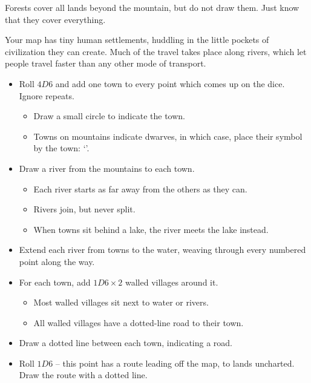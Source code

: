 \begin{multicols}{2}
Forests cover all lands beyond the mountain, but do not draw them. Just
know that they cover everything.


Your map has tiny human settlements, huddling in the little pockets of civilization they can create.
Much of the travel takes place along rivers, which let people travel faster than any other mode of transport.

\begin{itemize}
\item
  Roll $4D6$ and add one town to every point which comes up on the dice.
  Ignore repeats.

  \begin{itemize}
  \item
    Draw a small circle to indicate the town.
  \item
    Towns on mountains indicate dwarves, in which case, place their symbol by the town: `\Dw'.
  \end{itemize}
\item
  Draw a river from the mountains to each town.

  \begin{itemize}
  \item
    Each river starts as far away from the others as they can.
  \item
    Rivers join, but never split.
  \item
    When towns sit behind a lake, the river meets the lake instead.
  \end{itemize}
\item
  Extend each river from towns to the water, weaving through every numbered point along the way.
\item
  For each town, add $1D6 \times 2$ walled villages around it.
  \begin{itemize}
  \item
    Most walled villages sit next to water or rivers.
  \item
    All walled villages have a dotted-line road to their town.
  \end{itemize}
\item
  Draw a dotted line between each town, indicating a road.
\item
  Roll $1D6$ -- this point has a route leading off the map, to lands
  uncharted. Draw the route with a dotted line.
\end{itemize}



\end{multicols}
